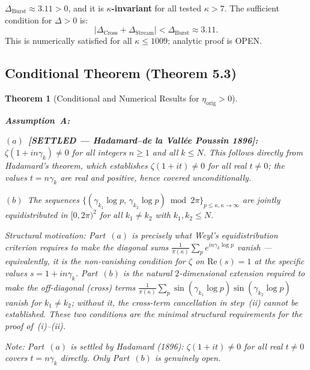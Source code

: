 \documentclass[11pt]{article}
\newtheorem{theorem}{Theorem}[section]
\newcommand{\etaorig}{\eta_{\mathrm{orig}}}
\newcommand{\Dburstvar}{\Delta_{\mathrm{Burst}}}
\newcommand{\Dcross}{\Delta_{\mathrm{Cross}}}
\newcommand{\Dstream}{\Delta_{\mathrm{Stream}}}
\begin{document}
$\Dburstvar\approx 3.11 > 0$, and it is \textbf{$\kappa$-invariant}
for all tested $\kappa > 7$.
The sufficient condition for $\Delta > 0$ is:
\[
|\Dcross + \Dstream| < \Dburstvar \approx 3.11.
\]
This is numerically satisfied for all $\kappa\leq 1009$;
analytic proof is OPEN.

\subsection{Conditional Theorem (Theorem 5.3)}

\begin{theorem}[Conditional and Numerical Results for $\etaorig > 0$]\label{thm:T5}

\textbf{Assumption~A:}

$(a)$~\textbf{[SETTLED --- Hadamard--de la Vall\'ee Poussin 1896]:}
$\zeta(1+in\gamma_k)\neq 0$ for all integers $n\geq 1$
and all $k\leq N$.
This follows directly from Hadamard's theorem, which establishes
$\zeta(1+it)\neq 0$ for all real $t\neq 0$; the values $t = n\gamma_k$
are real and positive, hence covered unconditionally.

$(b)$~The sequences
$\{(\gamma_{k_1}\log p,\,\gamma_{k_2}\log p)\bmod 2\pi\}_{p\leq\kappa,
\kappa\to\infty}$
are jointly equidistributed in $[0,2\pi)^2$
for all $k_1\neq k_2$ with $k_1,k_2\leq N$.

\emph{Structural motivation:}
Part~$(a)$ is precisely what Weyl's equidistribution criterion requires
to make the diagonal sums $\frac{1}{\pi(\kappa)}\sum_p e^{in\gamma_k\log p}$
vanish --- equivalently, it is the non-vanishing condition for $\zeta$ on
$\mathrm{Re}(s)=1$ at the specific values $s=1+in\gamma_k$.
Part~$(b)$ is the natural $2$-dimensional extension required to make the
off-diagonal (cross) terms
$\frac{1}{\pi(\kappa)}\sum_p\sin(\gamma_{k_1}\log p)\sin(\gamma_{k_2}\log p)$
vanish for $k_1\neq k_2$; without it, the cross-term cancellation
in step~(ii) cannot be established.
These two conditions are the minimal structural requirements for the proof
of~(i)--(ii).

\emph{Note:}
Part~$(a)$ is settled by Hadamard (1896):
$\zeta(1+it)\neq 0$ for all real $t\neq 0$ covers $t = n\gamma_k$ directly.
Only Part~$(b)$ is genuinely open.


\end{theorem}
\end{document}
